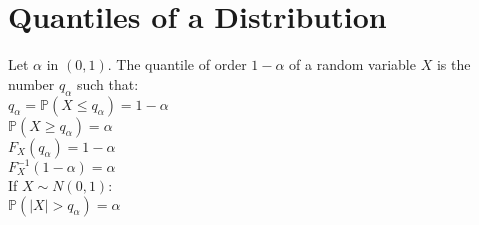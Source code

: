 \section{Quantiles of a Distribution}

Let $\alpha$ in $(0,1)$. The quantile of order $1 - \alpha$ of a random variable $X$ is the number $q_{\alpha}$ such that:\\

$q_{\alpha } = \displaystyle \mathbb{P}\left(X\leq q_{\alpha }\right)=1-\alpha$\\

$\mathbb{P}(X \geq q_{\alpha }) = \alpha$\\

$F_X(q_{\alpha}) = 1 - \alpha$\\

$F^{-1}_{X}(1-\alpha)= \alpha$\\

If $X \sim N(0,1)$:\\

$\mathbb{P}(|X| > q_{\alpha}) = \alpha$
